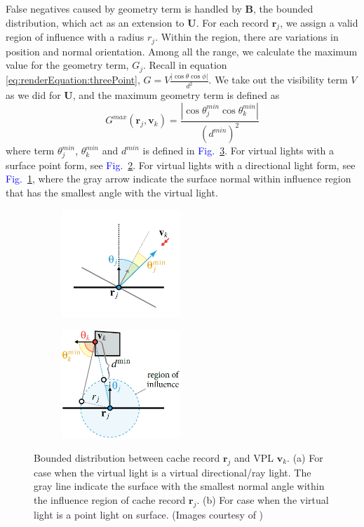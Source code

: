 \documentclass[]{book}
\renewcommand{\figurename}{\textcolor{blue}{Fig.\ }}
\begin{document}
False negatives caused by geometry term is handled by $\boldsymbol{B}$, the bounded distribution, which act as an extension to $\boldsymbol{U}$.
For each record $\mathbf{r}_j$, we assign a valid region of influence with a radius $r_j$.
Within the region, there are variations in position and normal orientation.
Among all the range, we calculate the maximum value for the geometry term, $G_j$.
Recall in equation \ref{eq:renderEquation:threePoint}, $G = V \frac{|\cos\theta \cos\phi|}{d^2}$.
We take out the visibility term $V$ as we did for $\boldsymbol{U}$, and the maximum geometry term is defined as
\begin{equation*}
	G^{max} (\mathbf{r}_j, \mathbf{v}_k)= \frac{|\cos\theta_j^{min} \cos\theta_k^{min}|}{(d^{min})^2}
\end{equation*}
where term $\theta_j^{min}$, $\theta_k^{min}$ and $d^{min}$ is defined in \figurename \ref{fig:IMP:represent:bound}.
For virtual lights with a surface point form, see \figurename \ref{fig:IMP:represent:bound:b}.
For virtual lights with a directional light form, see \figurename \ref{fig:IMP:represent:bound:a}, where the gray arrow indicate the surface normal within influence region that has the smallest angle with the virtual light.

\begin{figure}[t]
	\begin{subfigure}{0.5\textwidth}
		\centering
		\includegraphics[height=1.6in]{img/IMP_3B_1.png}
		\caption{}
		\label{fig:IMP:represent:bound:a}
	\end{subfigure}%
	\begin{subfigure}{0.5\textwidth}
		\centering
		\includegraphics[height=1.6in]{img/IMP_3B_2.png}
		\caption{}
		\label{fig:IMP:represent:bound:b}
	\end{subfigure}
	\caption[Bounded Distribution]{Bounded distribution between cache record $\mathbf{r}_j$ and VPL $\mathbf{v}_k$. (a) For case when the virtual light is a virtual directional/ray light. The gray line indicate the surface with the smallest normal angle within the influence region of cache record $\mathbf{r}_j$. (b) For case when the virtual light is a point light on surface. (Images courtesy of \citeauthor{georgiev2012importance})}
	\label{fig:IMP:represent:bound}
\end{figure}
\end{document}
